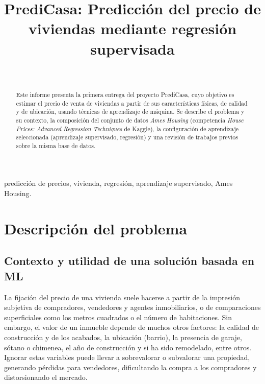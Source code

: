 \documentclass[journal]{IEEEtran}
\begin{document}
\title{PrediCasa: Predicción del precio de viviendas mediante regresión supervisada}
\author{\\
}
\maketitle

\begin{abstract}
Este informe presenta la primera entrega del proyecto PrediCasa, cuyo objetivo es estimar el precio de venta de viviendas a partir de sus características físicas, de calidad y de ubicación, usando técnicas de aprendizaje de máquina. Se describe el problema y su contexto, la composición del conjunto de datos \textit{Ames Housing} (competencia \textit{House Prices: Advanced Regression Techniques} de Kaggle), la configuración de aprendizaje seleccionada (aprendizaje supervisado, regresión) y una revisión de trabajos previos sobre la misma base de datos.
\end{abstract}

\begin{IEEEkeywords}
predicción de precios, vivienda, regresión, aprendizaje supervisado, Ames Housing.
\end{IEEEkeywords}

\section{Descripción del problema}

\subsection{Contexto y utilidad de una solución basada en ML}
La fijación del precio de una vivienda suele hacerse a partir de la impresión subjetiva de compradores, vendedores y agentes inmobiliarios, o de comparaciones superficiales como los metros cuadrados o el número de habitaciones. Sin embargo, el valor de un inmueble depende de muchos otros factores: la calidad de construcción y de los acabados, la ubicación (barrio), la presencia de garaje, sótano o chimenea, el año de construcción y si ha sido remodelado, entre otros. Ignorar estas variables puede llevar a sobrevalorar o subvalorar una propiedad, generando pérdidas para vendedores, dificultando la compra a los compradores y distorsionando el mercado.
\end{document}
